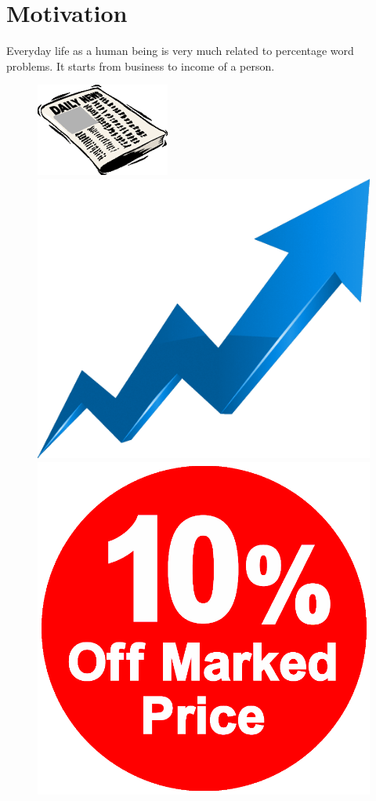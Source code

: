 \documentclass[document.tex]{subfiles}
\begin{document}
\section{Motivation}
Everyday life as a human being is very much related to percentage word problems. It starts from business to income of a person. 
\begin{figure}[H]
	\begin{multicols}{4}[\columnsep=2.0cm]
		\includegraphics[scale=0.55]{imgs/news.png}
		\columnbreak
		
		\includegraphics[scale=0.15]{imgs/stock.png}
		\columnbreak
		
		\includegraphics[scale=0.092]{imgs/product_prices.png}
		\columnbreak
		

\end{multicols}
\end{figure}
\end{document}
